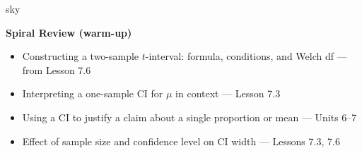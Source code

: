 \documentclass[10pt]{article}
\begin{document}
\begin{skillbox}{sky}
\begin{minipage}[t]{0.55\linewidth}\vspace{0pt}
    \textbf{Spiral Review (warm-up)}
    \begin{itemize}
        \item Constructing a two-sample $t$-interval: formula, conditions, and Welch df
              --- from Lesson 7.6
        \item Interpreting a one-sample CI for $\mu$ in context --- Lesson 7.3
        \item Using a CI to justify a claim about a single proportion or mean --- Units 6--7
        \item Effect of sample size and confidence level on CI width --- Lessons 7.3, 7.6
    \end{itemize}
\end{minipage}
\hfill
\begin{minipage}[t]{0.38\linewidth}\vspace{0pt}\centering
\end{minipage}
\end{skillbox}
\end{document}
